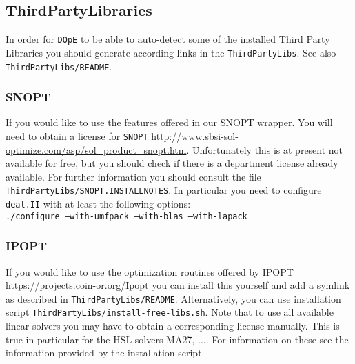 \subsection{ThirdPartyLibraries}
In order for \texttt{DOpE} to be able to auto-detect some of the installed 
Third Party Libraries you should generate according links in the 
\texttt{ThirdPartyLibs}. See also \texttt{ThirdPartyLibs/README}.

\subsubsection{SNOPT}
If you would like to use the features offered in our SNOPT wrapper. You will 
need to obtain a license for \texttt{SNOPT} 
\url{http://www.sbsi-sol-optimize.com/asp/sol_product_snopt.htm}.
Unfortunately this is at present not available for free, but you should 
check if 
there is a department license already available.
For further information you should consult the file 
\texttt{ThirdPartyLibs/SNOPT.INSTALLNOTES}. In particular you need to configure 
\texttt{deal.II} with at least the following options:\\
\texttt{./configure --with-umfpack --with-blas --with-lapack}

\subsubsection{IPOPT}
If you would like to use the optimization routines offered by IPOPT
\url{https://projects.coin-or.org/Ipopt} you can  
install this yourself and add a symlink as described in \texttt{ThirdPartyLibs/README}.
Alternatively, you can use installation script
\texttt{ThirdPartyLibs/install-free-libs.sh}. Note that to use all 
available linear solvers you may have to obtain a corresponding license 
manually. This is true in particular for the HSL solvers MA27, $\ldots$.
For information on these see the information provided by the installation
script.


